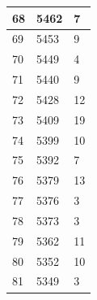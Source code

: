 \documentclass{article}
\begin{document}
\begin{center}
\begin{longtable}{|l|l|l|}
		\hline
		68                                                        & 5462                                                               & 7       \\ 
		\hline
		69                                                        & 5453                                                               & 9       \\ 
		\hline
		70                                                        & 5449                                                               & 4       \\ 
		\hline
		71                                                        & 5440                                                               & 9       \\ 
		\hline
		72                                                        & 5428                                                               & 12      \\ 
		\hline
		73                                                        & 5409                                                               & 19      \\ 
		\hline
		74                                                        & 5399                                                               & 10      \\ 
		\hline
		75                                                        & 5392                                                               & 7       \\ 
		\hline
		76                                                        & 5379                                                               & 13      \\ 
		\hline
		77                                                        & 5376                                                               & 3       \\ 
		\hline
		78                                                        & 5373                                                               & 3       \\ 
		\hline
		79                                                        & 5362                                                               & 11      \\ 
		\hline
		80                                                        & 5352                                                               & 10      \\ 
		\hline
		81                                                        & 5349                                                               & 3       \\ 

\end{longtable}
\end{center}
\end{document}
